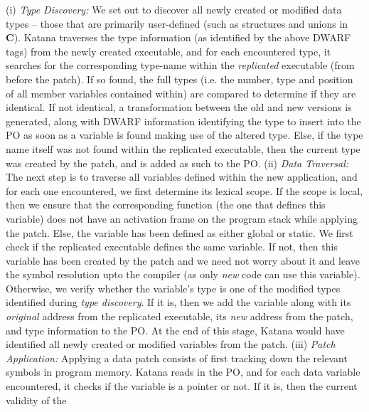 (i) {\it Type Discovery:} We set out to discover all newly created or
modified data types -- those that are primarily user-defined (such as
structures and unions in {\bf C}). Katana traverses the type information
(as identified by the above DWARF tags) from the newly created executable,
 and for each encountered type, it searches for
the corresponding type-name within the {\it replicated} executable
(from before the patch). If so found, the full types (i.e. the number,
type and position of all member variables contained within) are
compared to determine if they are identical. If not identical,
a transformation between the old and new versions is generated, along
with DWARF information identifying the type to insert into the PO as
soon as a variable is found making use of the altered type.
 Else, if
the type name itself was not found within the replicated executable, then the
current type was created by the patch, and is added as such to the PO.
\newline
(ii) {\it Data Traversal:} The next step is to traverse all variables
defined within the new application, and for each one encountered,
we first determine its 
lexical scope.
If the scope is
local, then we ensure that the corresponding function (the one that
defines this variable) does not have an activation frame on  
the program stack while
applying the patch. Else, the variable has been defined as either
global or static. We first check if the replicated executable defines
the same variable. If not, then this variable has been created by the
patch and we need not worry about it and leave the symbol resolution upto
the compiler (as only {\it new} code can use this variable). Otherwise,
we verify whether the variable's type is one of the
modified types identified during {\it type discovery}. If it is, then
we add the variable along with its {\it original} address from the replicated
executable, its {\it new} address from the patch, and type information to the
PO. At the end of this stage, Katana would have identified all newly
created or modified variables from the patch. 
\newline
(iii) {\it Patch Application: } Applying a data patch consists of
first tracking down the relevant symbols in program memory. Katana
reads in the PO, and for each data variable encountered, it checks if
the variable is a pointer or not. If it is, then the current validity of the
